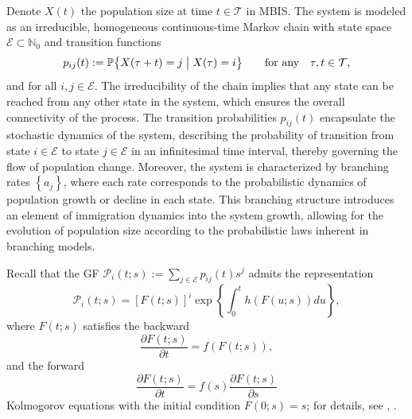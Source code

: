 \documentclass[10pt,reqno]{amsart}
\theoremstyle{definition}
\numberwithin{equation}{section}
\begin{document}
    Denote $X(t)$ the population size at time $t\in\mathcal{T}$ in MBIS. The system is modeled as an irreducible,
    homogeneous continuous-time Markov chain with state space $\mathcal{E}\subset{{\mathbb{N}}_0}$ and transition functions
\[
    {p_{ij}(t)}:={\mathbb{P}}\bigl\{{X(\tau + t)=j\bigm\vert{X(\tau)=i}}\bigr\} \qquad {\text{for any}} \quad \tau,t\in\mathcal{T},
\]
    and for all $i,j\in\mathcal{E}$. The irreducibility of the chain implies that any state can be reached from any other state
    in the system, which ensures the overall connectivity of the process. The transition probabilities ${p_{ij}(t)}$ encapsulate
    the stochastic dynamics of the system, describing the probability of transition from state $i\in\mathcal{E}$ to state
    $j\in\mathcal{E}$ in an infinitesimal time interval, thereby governing the flow of population change. Moreover, the system
    is characterized by branching rates $\left\{a_j\right\}$, where each rate corresponds to the probabilistic dynamics of population
    growth or decline in each state. This branching structure introduces an element of immigration dynamics into the system
    growth, allowing for the evolution of population size according to the probabilistic laws inherent in branching models.

    Recall that the GF ${\mathcal{P}_{i}(t;s)}:=\sum_{j\in{\mathcal{E}}}p_{ij} (t)s^{j}$ admits the representation
\begin{equation}                            \label{IIB2.1}
    {\mathcal{P}_{i}(t;s)}=\left[F(t;s)\right]^{i}\exp\left\{\int_{0}^{t}h\left(F(u;s)\right)du\right\},
\end{equation}
    where $F(t;s)$ satisfies the backward
\begin{equation}                           \label{IIB2.2}
    \frac{\partial{F(t;s)}}{\partial{t}}=f\left(F(t;s)\right),
\end{equation}
    and the forward
\begin{equation}                           \label{IIB2.3}
    \frac{\partial{F(t;s)}}{\partial{t}}=f(s)\frac{\partial{F(t;s)}}{\partial{s}}
\end{equation}
    Kolmogorov equations with the initial condition $F(0;s)=s$; for details, see {\cite{Harris63}}, {\cite{Sev71}}.
\end{document}
